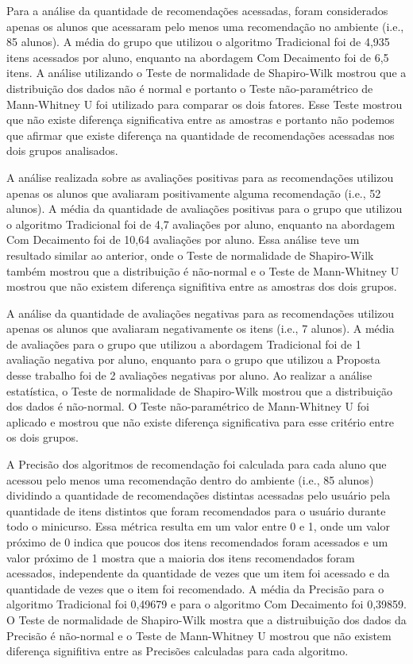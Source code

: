 Para a análise da quantidade de recomendações acessadas, foram considerados apenas os alunos que acessaram pelo
menos uma recomendação no ambiente (i.e., 85 alunos). A média do grupo que utilizou o algoritmo Tradicional foi de 4,935 itens
acessados por aluno, enquanto na abordagem Com Decaimento foi de 6,5 itens. A análise utilizando o Teste de normalidade de
Shapiro-Wilk mostrou que a distribuição dos dados não é normal e portanto o Teste não-paramétrico de Mann-Whitney U foi utilizado
para comparar os dois fatores. Esse Teste mostrou que não existe diferença significativa entre as amostras e portanto
não podemos que afirmar que existe diferença na quantidade de recomendações acessadas nos dois grupos analisados.

A análise realizada sobre as avaliações positivas para as recomendações utilizou apenas os alunos que avaliaram positivamente
alguma recomendação (i.e., 52 alunos). A média da quantidade de avaliações positivas para o grupo que utilizou o algoritmo
Tradicional foi de 4,7 avaliações por aluno, enquanto na abordagem Com Decaimento foi de 10,64 avaliações por aluno.
Essa análise teve um resultado similar ao anterior, onde o Teste de normalidade de Shapiro-Wilk também mostrou que a
distribuição é não-normal e o Teste de Mann-Whitney U mostrou que não existem diferença signifitiva entre
as amostras dos dois grupos.

A análise da quantidade de avaliações negativas para as recomendações utilizou apenas os alunos que avaliaram negativamente
os itens (i.e., 7 alunos). A média de avaliações para o grupo que utilizou a abordagem Tradicional foi de 1 avaliação negativa
por aluno, enquanto para o grupo que utilizou a Proposta desse trabalho foi de 2 avaliações negativas por aluno. Ao realizar
a análise estatística, o Teste de normalidade de Shapiro-Wilk mostrou que a distribuição dos dados é não-normal. O Teste
não-paramétrico de Mann-Whitney U foi aplicado e mostrou que não existe diferença significativa para esse critério entre
os dois grupos.

A Precisão dos algoritmos de recomendação foi calculada para cada aluno que acessou pelo menos uma recomendação dentro do
ambiente (i.e., 85 alunos) dividindo a quantidade de recomendações distintas acessadas pelo usuário pela quantidade de itens distintos
que foram recomendados para o usuário durante todo o minicurso. Essa métrica resulta em um valor entre 0 e 1, onde um valor
próximo de 0 indica que poucos dos itens recomendados foram acessados e um valor próximo de 1 mostra que a maioria dos itens
recomendados foram acessados, independente da quantidade de vezes que um item foi acessado e da quantidade de vezes que o
item foi recomendado. A média da Precisão para o algoritmo Tradicional foi 0,49679 e para o algoritmo Com Decaimento foi
0,39859. O Teste de normalidade de Shapiro-Wilk mostra que a distruibuição dos dados da Precisão é não-normal e o Teste
de Mann-Whitney U mostrou que não existem diferença signifitiva entre as Precisões calculadas para cada algoritmo.

